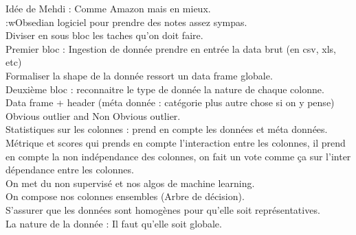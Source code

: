 \documentclass{article}
\begin{document}
Idée de Mehdi : Comme Amazon mais en mieux. \\
:wObsedian logiciel pour prendre des notes assez sympas.  \\
	Diviser en sous bloc les taches qu’on doit faire. \\
	Premier bloc : Ingestion de donnée prendre en entrée la data brut (en csv, xls, etc) \\
	Formaliser la shape de la donnée ressort un data frame globale.\\
	Deuxième bloc : reconnaitre le type de donnée la nature de chaque colonne. \\
	Data frame + header (méta donnée : catégorie plus autre chose si on y pense)\\
	Obvious outlier and Non Obvious outlier.  \\
	Statistiques sur les colonnes : prend en compte les données et méta données.\\
	Métrique et scores qui prends en compte l’interaction entre les colonnes, il prend en compte la non indépendance des colonnes, on fait un vote comme ça sur l’inter dépendance entre les colonnes. \\
	On met du non supervisé et nos algos de machine learning. \\
On compose nos colonnes ensembles (Arbre de décision).  \\
S’assurer que les données sont homogènes pour qu’elle soit représentatives. \\
La nature de la donnée : Il faut qu’elle soit globale. \\
\end{document}
